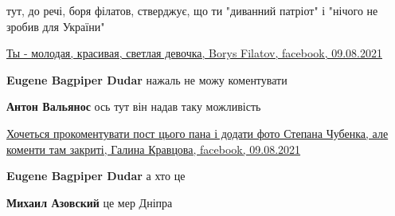 \begin{itemize}
 

тут, до речі, боря філатов, стверджує, що ти "диванний патріот" і "нічого не
зробив для України" 

\href{https://www.facebook.com/permalink.php?story_fbid=4232289493519582&id=100002157183088}{%
Ты - молодая, красивая, светлая девочка, Borys Filatov, facebook, 09.08.2021%
}

\begin{itemize}
 
\textbf{Eugene Bagpiper Dudar} нажаль не можу коментувати

 
\textbf{Антон Вальянос} ось тут він надав таку можливість 

\href{https://www.facebook.com/permalink.php?story_fbid=1262529564209858&id=100013584784762}{%
Хочеться прокоментувати пост цього пана і додати фото Степана Чубенка, але коменти там закриті, %
Галина Кравцова, %
facebook, 09.08.2021%
}


 
\textbf{Eugene Bagpiper Dudar} а хто це

 
\textbf{Михаил Азовский} це мер Дніпра

 

\end{itemize}
\end{itemize}
